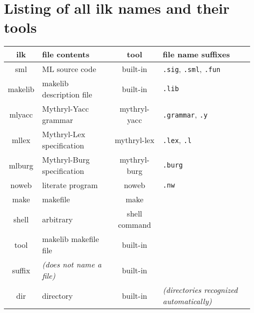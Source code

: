 
\section{Listing of all ilk names and their tools}

\begin{center}
\begin{tabular}{c|l|c|l}
ilk & file contents & tool & file name suffixes \\
\hline\hline
sml & ML source code & built-in & {\tt .sig}, {\tt .sml}, {\tt .fun} \\
makelib  & makelib description file & built-in & {\tt .lib} \\
mlyacc & Mythryl-Yacc grammar & mythryl-yacc & {\tt .grammar}, {\tt .y} \\
mllex & Mythryl-Lex specification & mythryl-lex & {\tt .lex}, {\tt .l} \\
mlburg & Mythryl-Burg specification & mythryl-burg & {\tt .burg} \\
noweb & literate program & noweb & {\tt .nw} \\
make & makefile & make & \\
shell & arbitrary & shell command & \\
tool & makelib makefile file & built-in & \\
suffix & {\it (does not name a file)} & built-in & \\
dir & directory & built-in & {\it (directories recognized automatically)}
\end{tabular}
\end{center}
